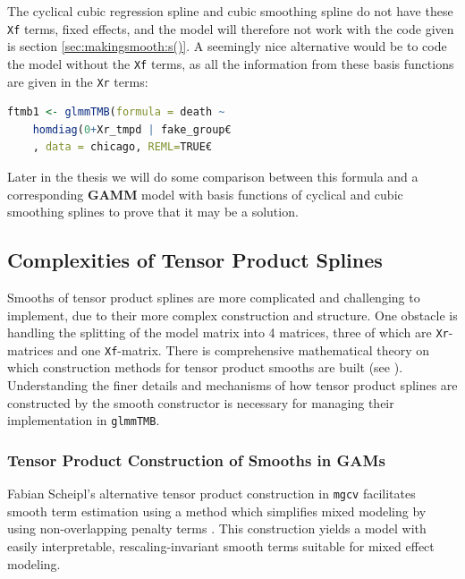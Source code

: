\documentclass[12pt, twoside,hidelinks]{article}
\theoremstyle{definition}
\numberwithin{equation}{section}
\begin{document}
The cyclical cubic regression spline and cubic smoothing spline do not have these \texttt{Xf} terms, fixed effects, and the model will therefore not work with the code given is section \ref{sec:makingsmooth:s()}. A seemingly nice alternative would be to code the model without the \texttt{Xf} terms, as all the information from these basis functions are given in the \texttt{Xr} terms:

\begin{lstlisting}[language=R]
    ftmb1 <- glmmTMB(formula = death ~ 
    homdiag(0+Xr_tmpd | fake_group€
    , data = chicago, REML=TRUE€
\end{lstlisting}

Later in the thesis we will do some comparison between this formula and a corresponding \textbf{GAMM} model with basis functions of cyclical and cubic smoothing splines to prove that it may be a solution.



\subsection{Complexities of Tensor Product Splines}\label{sec:makingsmooth:tensor}

Smooths of tensor product splines are more complicated and challenging to implement, due to their more complex construction and structure. One obstacle is handling the splitting of the model matrix into 4 matrices, three of which are \texttt{Xr}-matrices and one \texttt{Xf}-matrix. There is comprehensive mathematical theory on which construction methods for tensor product smooths are built (see \citet{wood2017}). Understanding the finer details and mechanisms of how tensor product splines are constructed by the smooth constructor is necessary for managing their implementation in \texttt{glmmTMB}. 

\subsubsection{Tensor Product Construction of Smooths in GAMs}\label{sec:makingsmooth:tensor:construction}

Fabian Scheipl's alternative tensor product construction in \texttt{mgcv} facilitates smooth term estimation using a method which simplifies mixed modeling by using non-overlapping penalty terms \citet{wood2017}. This construction yields a model with easily interpretable, rescaling-invariant smooth terms suitable for mixed effect modeling.
\end{document}
